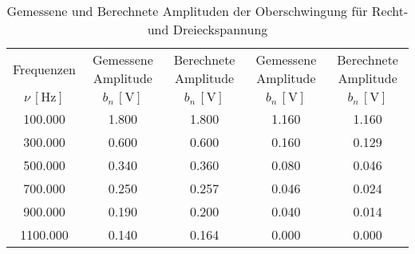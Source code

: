 \begin{table}[!h]
	\centering
	\begin{tabular}{|c|c|c|c|c|}
		\hline
		Frequenzen & Gemessene Amplitude & Berechnete Amplitude & Gemessene Amplitude & Berechnete Amplitude\\
		$\nu\,[\si{\hertz}]$ & $b_{n}\,[\si{\volt}]$ & $b_{n}\,[\si{\volt}]$ & $b_{n}\,[\si{\volt}]$ & $b_{n}\,[\si{\volt}]$\\\hline\hline
		\num{100.000}  & \num{1.800}  & \num{1.800}  & \num{1.160}  & \num{1.160} \\
		\num{300.000}  & \num{0.600}  & \num{0.600}  & \num{0.160}  & \num{0.129} \\
		\num{500.000}  & \num{0.340}  & \num{0.360}  & \num{0.080}  & \num{0.046} \\
		\num{700.000}  & \num{0.250}  & \num{0.257}  & \num{0.046}  & \num{0.024} \\
		\num{900.000}  & \num{0.190}  & \num{0.200}  & \num{0.040}  & \num{0.014} \\
		\num{1100.000}  & \num{0.140}  & \num{0.164}  & \num{0.000}  & \num{0.000} \\
		\hline
	\end{tabular}
	\caption{Gemessene und Berechnete Amplituden der Oberschwingung für Recht- und Dreieckspannung \label{tab:Analyse1}}
\end{table}